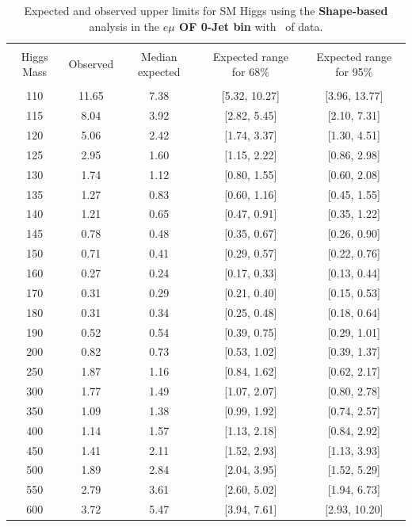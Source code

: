 \begin{table}[hbp!]
\begin{center}
\begin{tabular}{c c c c c}
\hline
\vspace{-3mm} && \\
 Higgs Mass & Observed  & Median expected & Expected range for 68\% & Expected range for 95\%   \\
\vspace{-3mm} && \\
\hline
110 & 11.65 & 7.38 & [5.32, 10.27] & [3.96, 13.77] \\
115 & 8.04 & 3.92 & [2.82, 5.45] & [2.10, 7.31] \\
120 & 5.06 & 2.42 & [1.74, 3.37] & [1.30, 4.51] \\
125 & 2.95 & 1.60 & [1.15, 2.22] & [0.86, 2.98] \\
130 & 1.74 & 1.12 & [0.80, 1.55] & [0.60, 2.08] \\
135 & 1.27 & 0.83 & [0.60, 1.16] & [0.45, 1.55] \\
140 & 1.21 & 0.65 & [0.47, 0.91] & [0.35, 1.22] \\
145 & 0.78 & 0.48 & [0.35, 0.67] & [0.26, 0.90] \\
150 & 0.71 & 0.41 & [0.29, 0.57] & [0.22, 0.76] \\
160 & 0.27 & 0.24 & [0.17, 0.33] & [0.13, 0.44] \\
170 & 0.31 & 0.29 & [0.21, 0.40] & [0.15, 0.53] \\
180 & 0.31 & 0.34 & [0.25, 0.48] & [0.18, 0.64] \\
190 & 0.52 & 0.54 & [0.39, 0.75] & [0.29, 1.01] \\
200 & 0.82 & 0.73 & [0.53, 1.02] & [0.39, 1.37] \\
250 & 1.87 & 1.16 & [0.84, 1.62] & [0.62, 2.17] \\
300 & 1.77 & 1.49 & [1.07, 2.07] & [0.80, 2.78] \\
350 & 1.09 & 1.38 & [0.99, 1.92] & [0.74, 2.57] \\
400 & 1.14 & 1.57 & [1.13, 2.18] & [0.84, 2.92] \\
450 & 1.41 & 2.11 & [1.52, 2.93] & [1.13, 3.93] \\
500 & 1.89 & 2.84 & [2.04, 3.95] & [1.52, 5.29] \\
550 & 2.79 & 3.61 & [2.60, 5.02] & [1.94, 6.73] \\
600 & 3.72 & 5.47 & [3.94, 7.61] & [2.93, 10.20] \\
\hline
\end{tabular}
\caption{Expected and observed upper limits for SM Higgs using the
  {\bf Shape-based} analysis in the {\bf $e\mu$ OF 0-Jet bin} with \intlumiEightTeV\ of data.}
\label{tab:bdtbase_uls_0jof}
\end{center}
\end{table}

